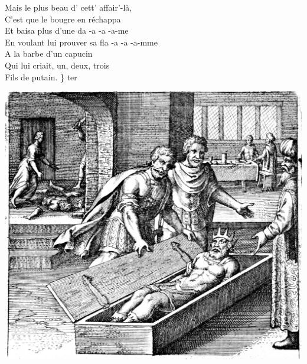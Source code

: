 \breakpage
Mais le plus beau d' cett' affair'-là, \bissimple
\\C'est que le bougre en réchappa \bissimple
\\Et baisa plus d'une da -a -a -a-me
\\En voulant lui prouver sa fla -a -a -a-mme
\\A la barbe d'un capucin \bissimple
\\Qui lui criait, un, deux, trois
\\Fils de putain. \} ter
\bigskip
\bigskip
\begin{center}
\includegraphics[width=1\textwidth]{images/brev58.png}
\end{center}
\breakpage